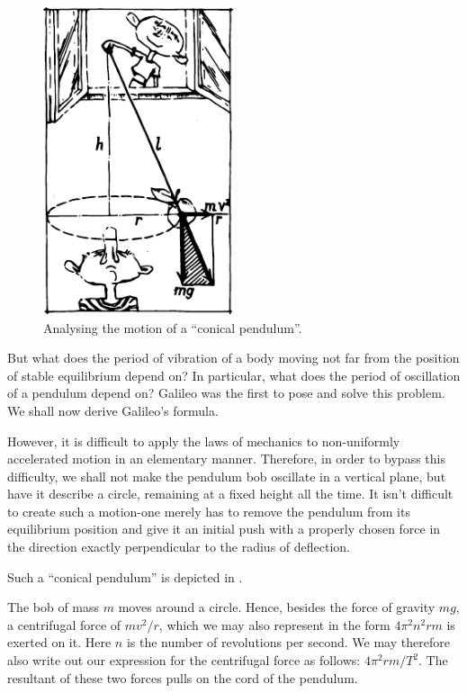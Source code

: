 \begin{figure}[!ht]
\centering
\includegraphics[width=0.5\textwidth]{figures/fig-04-02.pdf}
\caption{Analysing the motion of a ``conical pendulum''.}
\label{fig-4.02}
\end{figure}

But what does the period of vibration of a body moving
not far from the position of stable equilibrium depend on?
In particular, what does the period of oscillation of a
pendulum depend on? Galileo was the first to pose and
solve this problem. We shall now derive Galileo's formula.

However, it is difficult to apply the laws of mechanics
to non-uniformly accelerated motion in an elementary
manner. Therefore, in order to bypass this difficulty, we
shall not make the pendulum bob oscillate in a vertical
plane, but have it describe a circle, remaining at a fixed
height all the time. It isn't difficult to create such a
motion-one merely has to remove the pendulum from its
equilibrium position and give it an initial push with
a properly chosen force in the direction exactly perpendicular to the radius of deflection.

Such a ``conical pendulum'' is depicted in .

The bob of mass $m$ moves around a circle. Hence, besides
the force of gravity $mg$, a centrifugal force of $mv^{2}/r$,
which we may also represent in the form $4 \pi^{2} n^{2} rm$
is exerted on it. Here $n$ is the number of revolutions per
second. We may therefore also write out our expression
for the centrifugal force as follows: $4 \pi^{2} rm/T^{2}$. The resultant of these two forces pulls on the cord of the pendulum.

